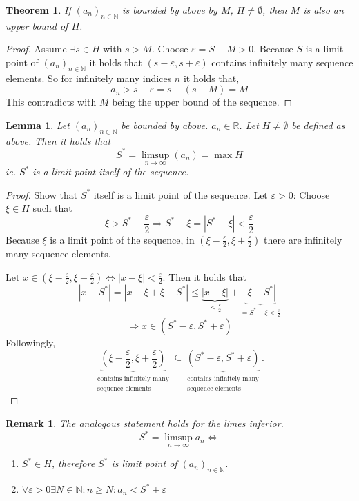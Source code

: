 \documentclass[a4paper,landscape,twocolumn]{article}
\newtheorem{theorem}{Theorem}
\newtheorem{rem}{Remark}
\newtheorem{lemma}{Lemma}
\newcommand\abs[1]{\left|#1\right|}
\newcommand\seq[1]{{\left(#1\right)}_{n \in \mathbb N}}
\begin{document}
\begin{theorem}
  If $\seq{a_n}$ is bounded by above by $M$, $H \neq \emptyset$, then $M$ is also an upper bound of $H$.
\end{theorem}
\begin{proof}
  Assume $\exists s \in H$ with $s > M$. Choose $\varepsilon = S - M > 0$.
  Because $S$ is a limit point of $\seq{a_n}$ it holds that $(s - \varepsilon, s + \varepsilon)$
  contains infinitely many sequence elements. So for infinitely many indices $n$ it holds that,
  \[ a_n > s - \varepsilon = s - (s - M) = M \]
  This contradicts with $M$ being the upper bound of the sequence.
\end{proof}

\begin{lemma}
  Let $\seq{a_n}$ be bounded by above. $a_n \in \mathbb R$. Let $H \neq \emptyset$ be defined as above.
  Then it holds that
  \[ S^* = \limsup_{n\to\infty}(a_n) = \max H \]
  ie. $S^*$ is a limit point itself of the sequence.
\end{lemma}
\begin{proof}
  Show that $S^*$ itself is a limit point of the sequence.
  Let $\varepsilon > 0$: Choose $\xi \in H$ such that
  \[ \xi > S^* - \frac\varepsilon2 \Rightarrow S^* - \xi = \abs{S^* - \xi} < \frac\varepsilon2 \]
  Because $\xi$ is a limit point of the sequence, in $(\xi - \frac\varepsilon2, \xi + \frac\varepsilon2)$
  there are infinitely many sequence elements.

  Let $x \in (\xi - \frac\varepsilon2, \xi + \frac\varepsilon2) \Leftrightarrow \abs{x - \xi} < \frac\varepsilon2$.
  Then it holds that
  \[
      \abs{x - S^*}
      = \abs{x - \xi + \xi - S^*}
      \leq \underbrace{\abs{x - \xi}}_{< \frac\varepsilon2} + \underbrace{\abs{\xi - S^*}}_{= S^* - \xi < \frac\varepsilon2}
  \] \[
      \Rightarrow x \in (S^* - \varepsilon, S^* + \varepsilon)
  \]
  Followingly,
  \[
    \underbrace{\left(\xi - \frac\varepsilon2, \xi + \frac\varepsilon2\right)}%
      _{\substack{\text{contains infinitely many} \\ \text{sequence elements}}}
    \subseteq \underbrace{\left(S^* - \varepsilon, S^* + \varepsilon\right)}%
      _{\substack{\text{contains infinitely many} \\ \text{sequence elements}}}.
  \]
\end{proof}

\begin{rem}
  The analogous statement holds for the limes inferior.
  \[ S^* = \limsup_{n\to\infty} a_n \Leftrightarrow \]
  \begin{enumerate}
    \item $S^* \in H$, therefore $S^*$ is limit point of $\seq{a_n}$.
    \item $\forall \varepsilon > 0 \exists N \in \mathbb N: n \geq N: a_n < S^* + \varepsilon$
  \end{enumerate}
\end{rem}
\end{document}
